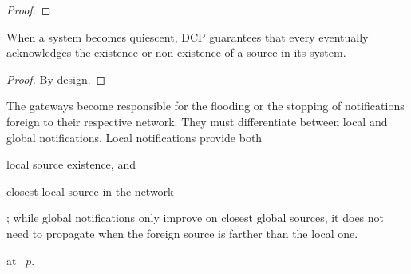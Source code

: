 \begin{definition}
\end{definition}

\begin{definition}
\end{definition}


\begin{lemma}
\end{lemma}

\begin{proof}
\end{proof}


\begin{lemma}
  When a system becomes quiescent, DCP guarantees that every \process
  eventually acknowledges the existence or non-existence of a source
  in its system.
\end{lemma}

\begin{proof}
  By design.
\end{proof}

The gateways become responsible for the flooding or the stopping of
notifications foreign to their respective network. They must
differentiate between local and global notifications. Local
notifications provide both \begin{inparaenum}[(i)]
\item local source existence, and
\item closest local source in the network
\end{inparaenum}; while global notifications only improve on closest global sources,
\ie it does not need to propagate when the foreign source is farther
than the local one.

\begin{definition}
\end{definition} 



\begin{algorithm}[h]
  
  \caption{\label{algo:xascast}\NAMEC at \Process~$p$. }
\end{algorithm}


